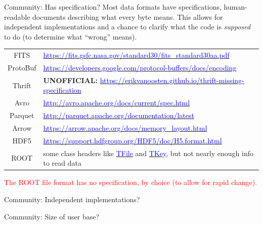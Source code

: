 \documentclass[aspectratio=169]{beamer}
\begin{document}
\begin{frame}{Community: Has specification?}
\vspace{0.5 cm}
Most data formats have specifications, human-readable documents describing what every byte means. This allows for independent implementations and a chance to clarify what the code is {\it supposed} to do (to determine what ``wrong'' means).

\vspace{0.25 cm}
\renewcommand{\arraystretch}{1.2}
\begin{tabular}{c l}
FITS & \href{https://fits.gsfc.nasa.gov/standard30/fits_standard30aa.pdf}{\textcolor{blue}{\small https://fits.gsfc.nasa.gov/standard30/fits\_standard30aa.pdf}} \\

ProtoBuf & \href{https://developers.google.com/protocol-buffers/docs/encoding}{\textcolor{blue}{\small https://developers.google.com/protocol-buffers/docs/encoding}} \\

Thrift & {\small {\bf UNOFFICIAL:} \href{https://erikvanoosten.github.io/thrift-missing-specification}{\textcolor{blue}{\small https://erikvanoosten.github.io/thrift-missing-specification}}} \\

Avro & \href{http://avro.apache.org/docs/current/spec.html}{\textcolor{blue}{\small http://avro.apache.org/docs/current/spec.html}} \\

Parquet & \href{http://parquet.apache.org/documentation/latest}{\textcolor{blue}{\small http://parquet.apache.org/documentation/latest}} \\

Arrow & \href{https://arrow.apache.org/docs/memory_layout.html}{\textcolor{blue}{\small https://arrow.apache.org/docs/memory\_layout.html}} \\

HDF5 & \href{https://support.hdfgroup.org/HDF5/doc/H5.format.html}{\textcolor{blue}{\small https://support.hdfgroup.org/HDF5/doc/H5.format.html}} \\

ROOT & {\small some class headers like \href{https://root.cern.ch/doc/master/classTFile.html}{\textcolor{blue}{TFile}} and \href{https://root.cern.ch/doc/master/classTKey.html}{\textcolor{blue}{TKey}}, but not nearly enough info to read data} \\
\end{tabular}

\vspace{0.25 cm}
\textcolor{red}{The ROOT file format has no specification, by choice (to allow for rapid change).}
\end{frame}

\begin{frame}{Community: Independent implementations?}
\vspace{0.5 cm}
\end{frame}

\begin{frame}{Community: Size of user base?}
\vspace{0.5 cm}
\end{frame}
\end{document}
